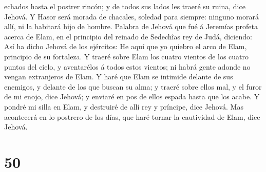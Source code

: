 echados hasta el postrer rincón; y de todos sus lados les traeré su
ruina, dice Jehová.  Y Hasor será morada de chacales,
soledad para siempre: ninguno morará allí, ni la habitará hijo de
hombre.  Palabra de Jehová que fué á Jeremías profeta
acerca de Elam, en el principio del reinado de Sedechîas rey de Judá,
diciendo:  Así ha dicho Jehová de los ejércitos: He aquí
que yo quiebro el arco de Elam, principio de su fortaleza.
 Y traeré sobre Elam los cuatro vientos de los cuatro
puntos del cielo, y aventarélos á todos estos vientos; ni habrá gente
adonde no vengan extranjeros de Elam.  Y haré que Elam se
intimide delante de sus enemigos, y delante de los que buscan su alma; y
traeré sobre ellos mal, y el furor de mi enojo, dice Jehová; y enviaré
en pos de ellos espada hasta que los acabe.  Y pondré mi
silla en Elam, y destruiré de allí rey y príncipe, dice Jehová.
 Mas acontecerá en lo postrero de los días, que haré
tornar la cautividad de Elam, dice Jehová.

\hypertarget{section-49}{%
\section{50}\label{section-49}}

